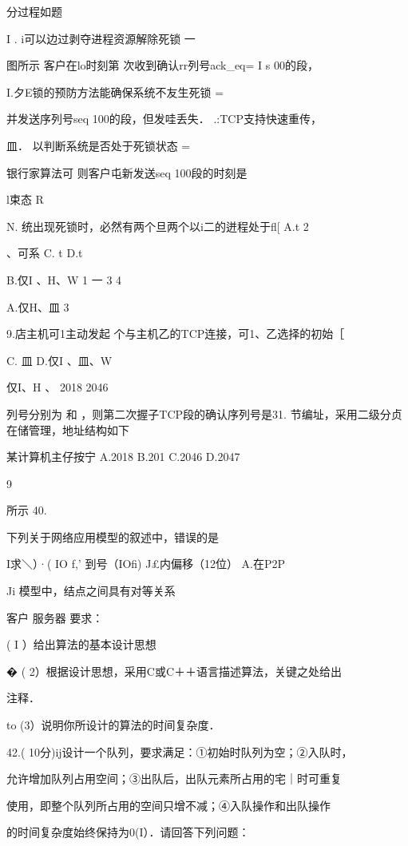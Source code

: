 {{    分过程如题

    I . i可以边过剥夺进程资源解除死锁    一

    图所示  客户在lo时刻第  次收到确认rr列号ack_eq= I s    00的段，

    I.夕E锁的预防方法能确保系统不友生死锁    =

    并发送序列号seq  100的段，但发哇丢失． .:TCP支持快速重传，

   皿．    以判断系统是否处于死锁状态    =

    银行家算法可    则客户屯新发送seq 100段的时刻是

    l束态    R

    N.    统出现死锁时，必然有两个旦两个以i二的迸程处于fl[    A.t    2

    、可系    C. t    D.t

    B.仅I 、H、W    1     一    3     4

    A.仅H、皿    3

    9.店主机可1主动发起  个与主机乙的TCP连接，可1、乙选择的初始［

   C.    皿    D.仅I 、皿、W

    仅I、H 、    2018   2046

    列号分别为    和    ，则第二次握子TCP段的确认序列号是31.    节编址，采用二级分贞在储管理，地址结构如下

   某计算机主仔按宁    A.2018    B.201    C.2046    D.2047

    9

   所示    40.

    下列关于网络应用模型的叙述中，错误的是

    I求＼）·( IO f,'     到号（IOfi)    J£内偏移（12位）    A.在P2P

    Ji    模型中，结点之间具有对等关系

    客户    服务器    要求：

    ( I ）给出算法的基本设计思想

    �    ( 2）根据设计思想，采用C或C＋＋语言描述算法，关键之处给出

    注释．

    to     (3）说明你所设计的算法的时间复杂度．

    42.( 10分)ij设计一个队列，要求满足：①初始时队列为空；②入队时，

    允许增加队列占用空间；③出队后，出队元素所占用的宅｜时可重复

    使用，即整个队列所占用的空间只增不减；④入队操作和出队操作

    的时间复杂度始终保持为0(I）．请回答下列问题：

}}
